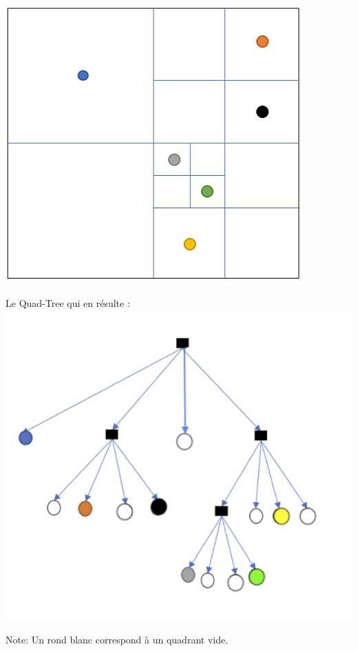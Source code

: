 \begin{Exercice}[10 minutes]
\begin{solution}
    \includegraphics[]{Quad-Tree3Solution1.PNG}
    
    Le Quad-Tree qui en résulte :\\
    
    \includegraphics[]{Quad-Tree3Solution2.PNG}
    
    Note: Un rond blanc correspond à un quadrant vide.
    
\end{solution}
\end{Exercice}



